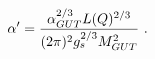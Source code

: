 \begin{equation}
\alpha' =
{ \alpha_{GUT}^{2/3} L(Q)^{2/3}\over (2\pi)^2 g_{s}^{2/3}
M_{GUT}^2 }
\ .
\end{equation}

